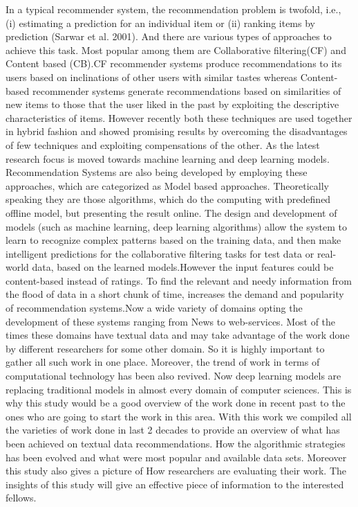 \newline In a typical recommender system, the recommendation problem is twofold, i.e., (i) estimating a prediction for an individual item or (ii) ranking items by prediction (Sarwar et al. 2001). And there are various types of approaches to achieve this task. Most popular among them are Collaborative filtering(CF) and Content based (CB).CF recommender systems produce recommendations to its users based on inclinations of other users with similar tastes whereas Content-based recommender systems generate recommendations based on similarities of new items to those that the user liked in the past by exploiting the descriptive characteristics of items. However recently both these techniques are used together in hybrid fashion and showed promising results by overcoming the disadvantages of few techniques and exploiting compensations of the other. As the latest research focus is moved towards machine learning and deep learning models. Recommendation Systems are also being developed by employing these approaches, which are categorized as Model based approaches. Theoretically speaking they are those algorithms, which do the computing with predefined offline model, but presenting the result online. The design and development of models (such as machine learning, deep learning algorithms) allow the system to learn to recognize complex patterns based on the training data, and then make intelligent predictions for the collaborative filtering tasks for test data or real-world data, based on the learned models.However the input features could be content-based instead of ratings. 
\newline To find the relevant and needy information from the flood of data in a short chunk of time, increases the demand and popularity of recommendation systems.Now a wide variety of domains opting the development of these systems ranging from News to web-services. Most of the times these domains have textual data and may take advantage of the work done by different researchers for some other domain. So it is highly important to gather all such work in one place. Moreover, the trend of work in terms of computational technology has been also revived. Now deep learning models are replacing traditional models in almost every domain of computer sciences. This is why this study would be a good overview of the work done in recent past to the ones who are going to start the work in this area.
\newline With this work we compiled all the varieties of work done in last 2 decades to provide an overview of what has been achieved on textual data recommendations. How the algorithmic strategies has been evolved and what were most popular and available data sets. Moreover this study also gives a picture of How researchers are evaluating their work. The insights of this study will give an effective piece of information to the interested fellows.

